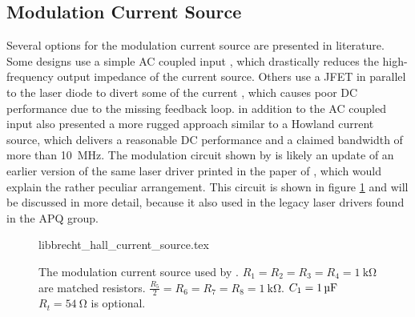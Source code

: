 \subsection{Modulation Current Source}%
\label{sec:modulation_current_source}
Several options for the modulation current source are presented in literature. Some designs use a simple AC coupled input \cite{diodelaser_modulation,libbrecht_hall}, which drastically reduces the high-frequency output impedance of the current source. Others use a JFET in parallel to the laser diode to divert some of the current \cite{laser_modulation_jfet,laser_modulation_jfet2,laser_modulation_jfet_appel}, which causes poor DC performance due to the missing feedback loop. \citeauthor{libbrecht_hall} \cite{laser_driver_digital,libbrecht_hall} in addition to the AC coupled input also presented a more rugged approach similar to a Howland current source, which delivers a reasonable DC performance and a claimed bandwidth of more than \qty{10}{\MHz}. The modulation circuit shown by \citeauthor{libbrecht_hall} is likely an update of an earlier version of the same laser driver printed in the paper of \citeauthor{diodelaser_modulation} \cite{diodelaser_modulation}, which would explain the rather peculiar arrangement. This circuit is shown in figure \ref{fig:libbrecht_hall_current_source} and will be discussed in more detail, because it also used in the legacy laser drivers found in the APQ group.
\begin{figure}[ht]
    \centering
        {libbrecht_hall_current_source.tex}
    \caption{The modulation current source used by \cite{laser_driver_digital,libbrecht_hall}. $R_1 = R_2 = R_3 = R_4 = \qty{1}{\kilo\ohm}$ are matched resistors. $\frac{R_5}{2} = R_6 = R_7 = R_8 = \qty{1}{\kilo\ohm}$. $C_1 = \qty{1}{\uF}$ $R_{t} = \qty{54}{\ohm}$ is optional.}
    \label{fig:libbrecht_hall_current_source}
\end{figure}

